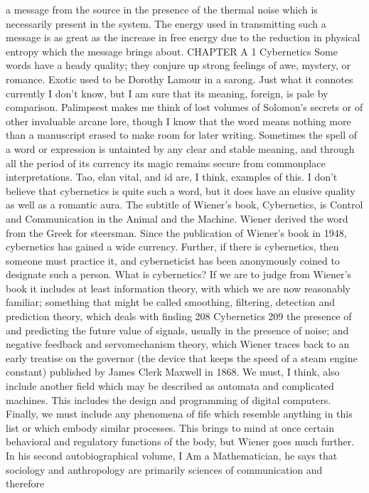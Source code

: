{{{{{{{{{{{a message from the source in the presence of the thermal noise
which is necessarily present in the system. The energy used in
transmitting such a message is as great as the increase in free
energy due to the reduction in physical entropy which the message
brings about.
CHAPTER A 1 Cybernetics
Some words have a heady quality; they conjure up strong
feelings of awe, mystery, or romance. Exotic used to be Dorothy
Lamour in a sarong. Just what it connotes currently I don’t know,
but I am sure that its meaning, foreign, is pale by comparison.
Palimpsest makes me think of lost volumes of Solomon’s secrets
or of other invaluable arcane lore, though I know that the word
means nothing more than a manuscript erased to make room for
later writing.
Sometimes the spell of a word or expression is untainted by any
clear and stable meaning, and through all the period of its currency
its magic remains secure from commonplace interpretations. Tao,
elan vital, and id are, I think, examples of this. I don’t believe that
cybernetics is quite such a word, but it does have an elusive quality
as well as a romantic aura.
The subtitle of Wiener’s book, Cybernetics, is Control and Communication
in the Animal and the Machine. Wiener derived the
word from the Greek for steersman. Since the publication of
Wiener’s book in 1948, cybernetics has gained a wide currency.
Further, if there is cybernetics, then someone must practice it, and
cyberneticist has been anonymously coined to designate such
a person.
What is cybernetics? If we are to judge from Wiener’s book it
includes at least information theory, with which we are now
reasonably familiar; something that might be called smoothing,
filtering, detection and prediction theory, which deals with finding
208
Cybernetics 209
the presence of and predicting the future value of signals, usually
in the presence of noise; and negative feedback and servomechanism
theory, which Wiener traces back to an early treatise on the
governor (the device that keeps the speed of a steam engine constant)
published by James Clerk Maxwell in 1868. We must, I
think, also include another field which may be described as
automata and complicated machines. This includes the design and
programming of digital computers.
Finally, we must include any phenomena of fife which resemble
anything in this list or which embody similar processes. This brings
to mind at once certain behavioral and regulatory functions of the
body, but Wiener goes much further. In his second autobiographical
volume, I Am a Mathematician, he says that sociology and
anthropology are primarily sciences of communication and therefore
}}}}}}}}}}}
